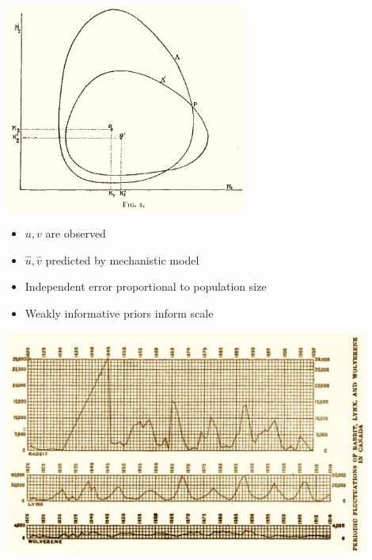 \documentclass[10pt]{report}
\begin{document}
\begin{center}
\includegraphics[width=0.6\textwidth]{img/volterra-solutions.jpg}
\end{center}

\begin{itemize}
\item $u, v$ are observed
\item $\hat{u}, \hat{v}$ predicted by mechanistic model
\item Independent error proportional to population size
\item Weakly informative priors inform scale
\end{itemize}

\begin{center}
\includegraphics[width=0.9\textwidth]{img/hudons-bay-data.png}
\end{center}
\end{document}
